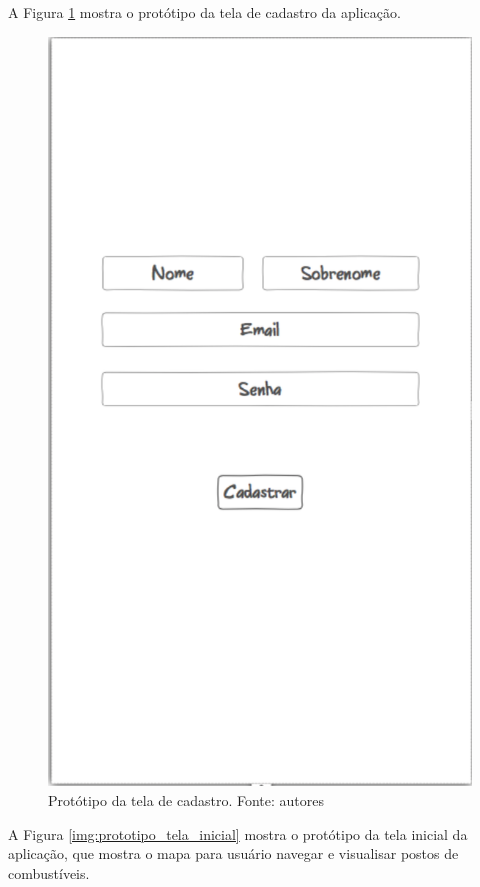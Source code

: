 A Figura \ref{img:prototipo_tela_de_cadastro} mostra o protótipo da tela de cadastro da aplicação.
\begin{figure}[H]
    \centering
    \includegraphics[scale=0.5]{figuras/prototipo_cadastro.png}
    \caption[Protótipo da tela de cadastro]{Protótipo da tela de cadastro. Fonte: autores}
    \label{img:prototipo_tela_de_cadastro}
\end{figure}
 \pagebreak
A Figura \ref{img:prototipo_tela_inicial} mostra o protótipo da tela inicial da aplicação, que mostra o mapa para usuário navegar e visualisar postos de combustíveis.

